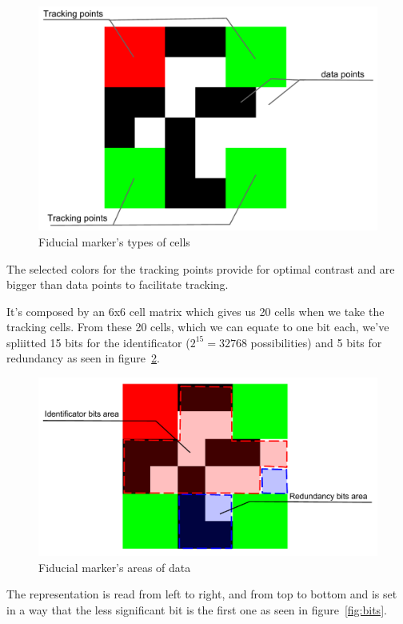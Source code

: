 \documentclass[DIV=calc, paper=a4, fontsize=11pt, twocolumn]{scrartcl}   %
\begin{document}
\begin{figure}[!h]
    \centering
    \includegraphics[width=0.9\columnwidth]{marker1.pdf}
    \caption{Fiducial marker's types of cells}
    \label{fig:marker1}
\end{figure}

The selected colors for the tracking points provide for optimal contrast and are bigger than data points to facilitate tracking. 


It's composed by an 6x6 cell matrix which gives us 20 cells when we take the tracking cells. From these 20 cells, which we can equate to one bit each, we’ve spliitted 15 bits for the identificator ($2^{15} = 32768$ possibilities) and 5 bits for redundancy as seen in figure~\ref{fig:marker2}.

\begin{figure}[!h]
    \centering
    \includegraphics[width=1.0\columnwidth]{marker2.pdf}
    \caption{Fiducial marker's areas of data}
    \label{fig:marker2}
\end{figure}

The representation is read from left to right, and from top to bottom and is set in a way that the less significant bit is the first one as seen in figure~\ref{fig:bits}.
\end{document}
